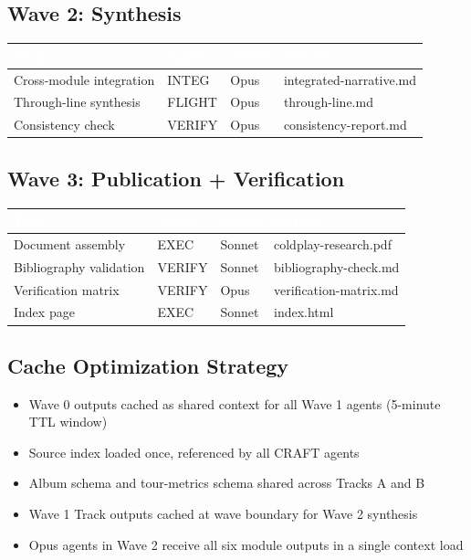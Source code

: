 \documentclass[11pt,letterpaper]{article}
\newcommand{\tableheader}[1]{\textbf{\sffamily\textcolor{white}{#1}}}
\begin{document}
\subsection{Wave 2: Synthesis}

\begin{center}
\begin{tabularx}{\textwidth}{L{2.5cm}L{2.5cm}C{1.2cm}X}
\toprule
{}
\tableheader{Task} & \tableheader{Agent} & \tableheader{Model} & \tableheader{Output} \\
\midrule
Cross-module integration & INTEG & Opus & integrated-narrative.md \\
Through-line synthesis & FLIGHT & Opus & through-line.md \\
Consistency check & VERIFY & Opus & consistency-report.md \\
\bottomrule
\end{tabularx}
\end{center}

\subsection{Wave 3: Publication + Verification}

\begin{center}
\begin{tabularx}{\textwidth}{L{2.5cm}L{2.5cm}C{1.2cm}X}
\toprule
{}
\tableheader{Task} & \tableheader{Agent} & \tableheader{Model} & \tableheader{Output} \\
\midrule
Document assembly & EXEC & Sonnet & coldplay-research.pdf \\
Bibliography validation & VERIFY & Sonnet & bibliography-check.md \\
Verification matrix & VERIFY & Opus & verification-matrix.md \\
Index page & EXEC & Sonnet & index.html \\
\bottomrule
\end{tabularx}
\end{center}

\subsection{Cache Optimization Strategy}

\begin{itemize}[leftmargin=2em]
  \item Wave 0 outputs cached as shared context for all Wave 1 agents (5-minute TTL window)
  \item Source index loaded once, referenced by all CRAFT agents
  \item Album schema and tour-metrics schema shared across Tracks A and B
  \item Wave 1 Track outputs cached at wave boundary for Wave 2 synthesis
  \item Opus agents in Wave 2 receive all six module outputs in a single context load
\end{itemize}
\end{document}
